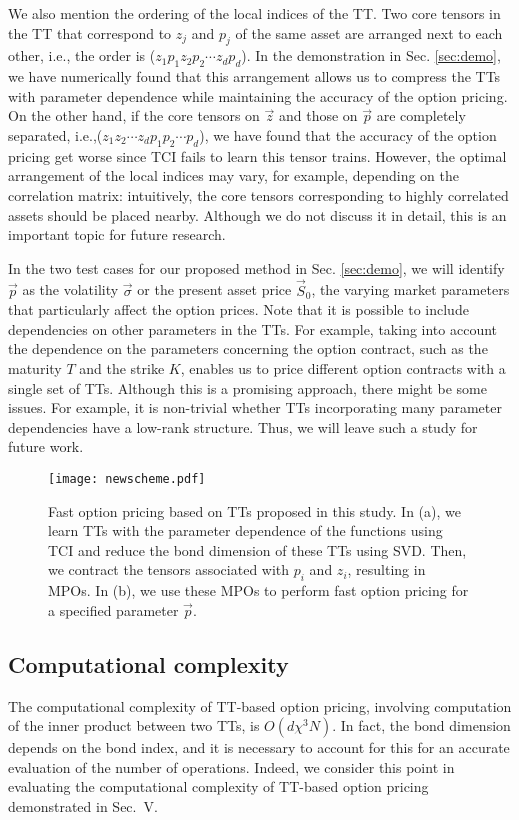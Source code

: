 We also mention the ordering of the local indices of the TT. 
Two core tensors in the TT that correspond to $z_j$ and $p_j$ of the same asset are arranged next to each other, i.e., the order is ($z_1 p_1 z_2 p_2 \cdots z_d p_d$). 
In the demonstration in Sec. \ref{sec:demo}, we have numerically found that this arrangement allows us to compress the TTs with parameter dependence while maintaining the accuracy of the option pricing. 
On the other hand, if the core tensors on $\vec{z}$ and those on $\vec{p}$ are completely separated, i.e.,($z_1 z_2 \cdots z_d p_1 p_2 \cdots p_d$), we have found that the accuracy of the option pricing get worse since TCI fails to learn this tensor trains. 
However, the optimal arrangement of the local indices may vary, for example, depending on the correlation matrix: intuitively, the core tensors corresponding to highly correlated assets should be placed nearby.
Although we do not discuss it in detail, this is an important topic for future research.



In the two test cases for our proposed method in Sec. \ref{sec:demo}, we will identify $\vec{p}$ as the volatility $\vec{\sigma}$ or the present asset price $\vec{S}_0$, the varying market parameters that particularly affect the option prices. 
Note that it is possible to include dependencies on other parameters in the TTs.
For example, taking into account the dependence on the parameters concerning the option contract, such as the maturity $T$ and the strike $K$, enables us to price different option contracts with a single set of TTs.
Although this is a promising approach, there might be some issues. For example, it is non-trivial whether TTs incorporating many parameter dependencies have a low-rank structure. Thus, we will leave such a study for future work.

\begin{figure*}[ht]
    \centering
        \texttt{[image: newscheme.pdf]}
        \caption{Fast option pricing based on TTs proposed in this study.
    In (a), we learn TTs with the parameter dependence of the functions using TCI and reduce the bond dimension of these TTs using SVD.
    Then, we contract the tensors associated with \(p_i\) and \(z_i\), resulting in MPOs.
    In (b), we use these MPOs to perform fast option pricing for a specified parameter $\vec{p}$.}
\label{fig:new_scheme}
\end{figure*}


\subsection{Computational complexity}
The computational complexity of TT-based option pricing, involving computation of the inner product between two TTs, is $O(d \chi^{3} N)$.
In fact, the bond dimension depends on the bond index, and it is necessary to account for this for an accurate evaluation of the number of operations. 
Indeed, we consider this point in evaluating the computational complexity of TT-based option pricing demonstrated in Sec.~V.

